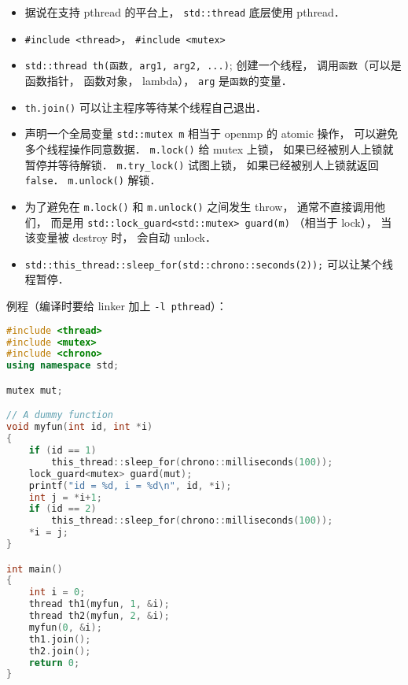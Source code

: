 
\begin{itemize}
\item 据说在支持 pthread 的平台上， \verb|std::thread| 底层使用 pthread．
\item \verb|#include <thread>|， \verb|#include <mutex>|
\item \verb|std::thread th(函数, arg1, arg2, ...)|; 创建一个线程， 调用\verb|函数|（可以是函数指针， 函数对象， lambda）， \verb|arg| 是\verb|函数|的变量．
\item \verb|th.join()| 可以让主程序等待某个线程自己退出．
\item 声明一个全局变量 \verb|std::mutex m| 相当于 openmp 的 atomic 操作， 可以避免多个线程操作同意数据． \verb|m.lock()| 给 mutex 上锁， 如果已经被别人上锁就暂停并等待解锁． \verb|m.try_lock()| 试图上锁， 如果已经被别人上锁就返回 \verb|false|． \verb|m.unlock()| 解锁．
\item 为了避免在 \verb|m.lock()| 和 \verb|m.unlock()| 之间发生 throw， 通常不直接调用他们， 而是用 \verb|std::lock_guard<std::mutex> guard(m)| （相当于 lock）， 当该变量被 destroy 时， 会自动 unlock．
\item \verb|std::this_thread::sleep_for(std::chrono::seconds(2));| 可以让某个线程暂停．
\end{itemize}

例程（编译时要给 linker 加上 \verb|-l pthread|）：
\begin{lstlisting}[language=cpp]
#include <thread>
#include <mutex>
#include <chrono>
using namespace std;

mutex mut;

// A dummy function
void myfun(int id, int *i)
{
    if (id == 1)
        this_thread::sleep_for(chrono::milliseconds(100));
    lock_guard<mutex> guard(mut);
    printf("id = %d, i = %d\n", id, *i);
    int j = *i+1;
    if (id == 2)
        this_thread::sleep_for(chrono::milliseconds(100));
    *i = j;
}

int main()
{
    int i = 0;
    thread th1(myfun, 1, &i);
    thread th2(myfun, 2, &i);
    myfun(0, &i);
    th1.join();
    th2.join();
    return 0;
}
\end{lstlisting}

